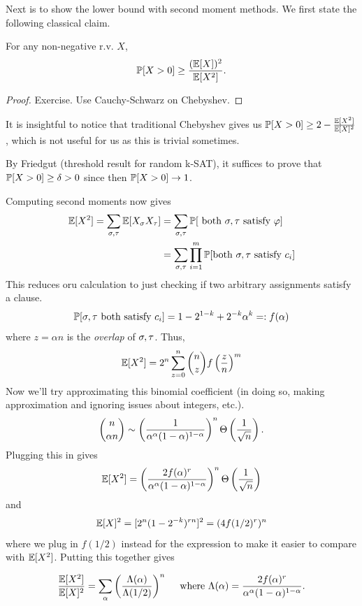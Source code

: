 \documentclass[11 pt]{scrartcl}
\begin{document}
    Next is to show the lower bound with second moment methods. We first state the following classical claim. 
    \begin{claim}
        For any non-negative r.v. $X$, 
        \[ \mathbb P[X > 0] \geq \dfrac{(\mathbb E[X])^2}{\mathbb E[X^2]}.\] 
    \end{claim}
    \begin{proof}
        Exercise. Use Cauchy-Schwarz on Chebyshev. 
    \end{proof}
    It is insightful to notice that traditional Chebyshev gives us $\mathbb P[X > 0] \geq 2 - \frac{\mathbb E[X^2]}{\mathbb E[X]^2}$, which is not useful for us as this is trivial sometimes.  

    By Friedgut (threshold result for random k-SAT), it suffices to prove that $\mathbb P[X > 0] \geq \delta > 0$ since then $\mathbb P[X > 0] \to 1$. 

    Computing second moments now gives 
    \begin{align*}
        \mathbb E[X^2] = \sum_{\sigma, \tau} \mathbb E[X_\sigma X_\tau] &= \sum_{\sigma, \tau} \mathbb P[\text{ both }\sigma, \tau\text{ satisfy }\varphi] \\ 
                                                      &= \sum_{\sigma, \tau} \prod_{i=1}^m \mathbb P[\text{both }\sigma,\tau\text{ satisfy } c_i] 
    \end{align*}
    This reduces oru calculation to just checking if two arbitrary assignments satisfy a clause. 
    \[ \mathbb P[\sigma, \tau \text{ both satisfy }c_i] = 1 - 2^{1-k} + 2^{-k}\alpha^k =: f(\alpha)\] 
    where $z = \alpha n$ is the \emph{overlap} of $\sigma, \tau$. Thus, 
    \begin{align*}
        \mathbb E[X^2] &= 2^n \sum_{z = 0}^n \dbinom{n}{z} f\left(\frac{z}{n}\right)^m \\ 
    \end{align*}
    Now we'll try approximating this binomial coefficient (in doing so, making approximation and ignoring issues about integers, etc.). 
    \[ \dbinom{n}{\alpha n} \sim \left(\dfrac{1}{\alpha^\alpha (1-\alpha)^{1-\alpha}}\right)^n \Theta\left(\dfrac{1}{\sqrt{n}}\right).\] 
        Plugging this in gives 
        \[ \mathbb E[X^2] = \left(\dfrac{2 f(\alpha)^r}{\alpha^\alpha (1-\alpha)^{1-\alpha}}\right)^n \Theta\left(\dfrac{1}{\sqrt{n}}\right)\] 
        and 
        \[ \mathbb E[X]^2 = [2^n(1-2^{-k})^{rn}]^2 = (4f(1/2)^r)^n \]
        where we plug in $f(1/2)$ instead for the expression to make it easier to compare with $\mathbb E[X^2]$. Putting this together gives 

        \[ \dfrac{\mathbb E[X^2]}{\mathbb E[X]^2} = \sum_\alpha \left(\dfrac{\Lambda(\alpha)}{\Lambda(1/2)}\right)^n \quad\text{ where } \Lambda(\alpha) = \dfrac{2f(\alpha)^r}{\alpha^\alpha (1-\alpha)^{1-\alpha}}.\] 
\end{document}
